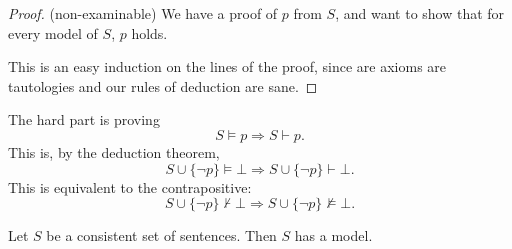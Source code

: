 \documentclass[a4paper]{article}
\begin{document}
\begin{proof}(non-examinable)
  We have a proof of $p$ from $S$, and want to show that for every model of $S$, $p$ holds.

  This is an easy induction on the lines of the proof, since are axioms are tautologies and our rules of deduction are sane.
\end{proof}

The hard part is proving
\[
  S\models p \Rightarrow  S\vdash p.
\]
This is, by the deduction theorem,
\[
  S\cup \{\neg p\}\models \bot \Rightarrow  S\cup \{\neg p\}\vdash \bot.
\]
This is equivalent to the contrapositive:
\[
  S\cup \{\neg p\} \not\vdash \bot \Rightarrow  S\cup \{\neg p\}\not\models \bot.
\]

\begin{thm}
  Let $S$ be a consistent set of sentences. Then $S$ has a model.
\end{thm}
\end{document}
